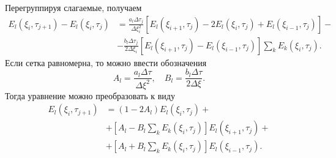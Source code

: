     Перегруппируя слагаемые, получаем
    \begin{align*}
        E_l(\xi_i, \tau_{j+1}) - E_l(\xi_i, \tau_j) & =
        \frac{a_l\Delta\tau_j}{\Delta\xi_i^2}
        [E_l(\xi_{i+1}, \tau_j) - 2E_l(\xi_i, \tau_j) + E_l(\xi_{i-1}, \tau_j)]
        -\\
        & - \frac{b_l\Delta\tau_j}{2\Delta\xi_i}
        [E_l(\xi_{i+1}, \tau_j) - E_l(\xi_{i-1}, \tau_j)]
        \sum_k E_k(\xi_i, \tau_j).
    \end{align*}
    Если сетка равномерна, то можно ввести обозначения
    \[
        A_l = \frac{a_l \Delta\tau}{\Delta\xi^2},\quad
        B_l = \frac{b_l\Delta\tau}{2\Delta\xi}.
    \]
    Тогда уравнение можно преобразовать к виду
    \begin{align*}
        E_l(\xi_i, \tau_{j+1}) & = (1-2A_l)E_l(\xi_i, \tau_j) +\\
        & +
            \left[A_l - B_l\sum_k E_k(\xi_i,\tau_j)\right]E_l(\xi_{i+1},\tau_j)
          + \\
        & +
            \left[A_l + B_l\sum_k E_k(\xi_i,\tau_j)\right]E_l(\xi_{i-1},\tau_j).
    \end{align*}

